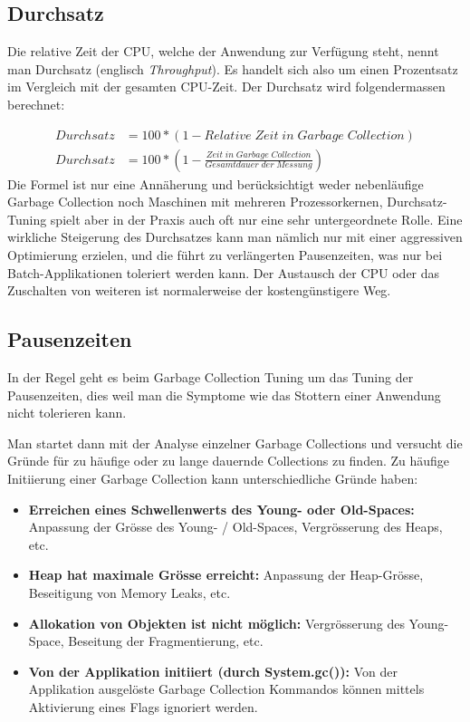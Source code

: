 \subsection{Durchsatz\label{gc_tuning_durchsatz}}
Die relative Zeit der CPU, welche der Anwendung zur Verfügung steht, nennt man Durchsatz (englisch \textit{Throughput}). Es handelt sich also um einen Prozentsatz im Vergleich mit der gesamten CPU-Zeit. Der Durchsatz wird folgendermassen berechnet:

 \begin{align*}
         Durchsatz &= 100 * (1-Relative\;Zeit\;in\;Garbage\;Collection)\\
         Durchsatz &= 100 * (1-\frac{Zeit\;in\;Garbage\;Collection}{Gesamtdauer\;der\;Messung})
 \end{align*}
Die Formel ist nur eine Annäherung und berücksichtigt weder nebenläufige Garbage Collection noch Maschinen mit mehreren Prozessorkernen, Durchsatz-Tuning spielt aber in der Praxis auch oft nur eine sehr untergeordnete Rolle\cite{langerkreftJavaCore}. Eine wirkliche Steigerung des Durchsatzes kann man nämlich nur mit einer aggressiven Optimierung erzielen, und die führt zu verlängerten Pausenzeiten, was nur bei Batch-Applikationen toleriert werden kann. Der Austausch der CPU oder das Zuschalten von weiteren ist normalerweise der kostengünstigere Weg.

\subsection{Pausenzeiten\label{gc_tuning_pausenzeiten}}
In der Regel geht es beim Garbage Collection Tuning um das Tuning der Pausenzeiten, dies weil man die Symptome wie das Stottern einer Anwendung nicht tolerieren kann. 

Man startet dann mit der Analyse einzelner Garbage Collections und versucht die Gründe für zu häufige oder zu lange dauernde Collections zu finden. Zu häufige Initiierung einer Garbage Collection kann unterschiedliche Gründe haben:
\begin{itemize}
\item \textbf{Erreichen eines Schwellenwerts des Young- oder Old-Spaces: } Anpassung der Grösse des Young- / Old-Spaces, Vergrösserung des Heaps, etc.
\item \textbf{Heap hat maximale Grösse erreicht:} Anpassung der Heap-Grösse, Beseitigung von Memory Leaks, etc.
\item \textbf{Allokation von Objekten ist nicht möglich:} Vergrösserung des Young-Space, Beseitung der Fragmentierung, etc. 
\item \textbf{Von der Applikation initiiert (durch System.gc()):} Von der Applikation ausgelöste Garbage Collection Kommandos können mittels Aktivierung eines Flags ignoriert werden.
\end{itemize}



